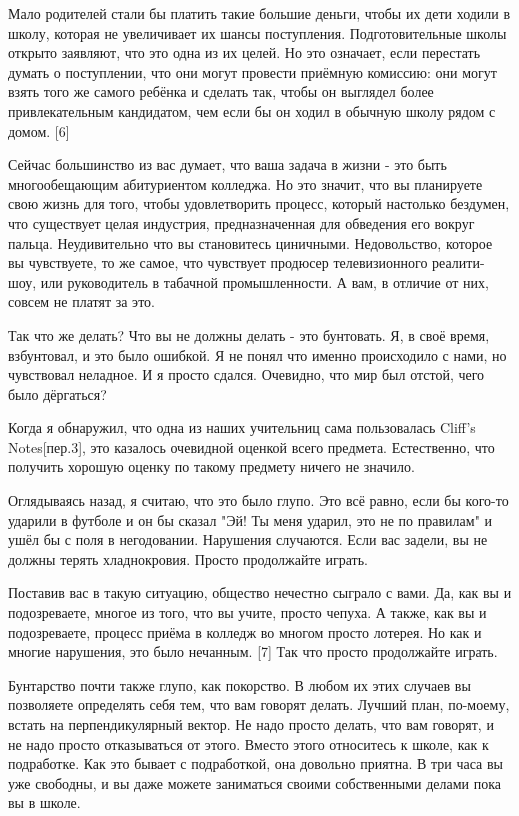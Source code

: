 \documentclass[ebook,12pt,oneside,openany]{memoir}
\begin{document}
Мало родителей стали бы платить такие большие деньги, чтобы их дети
ходили в школу, которая не увеличивает их шансы поступления.
Подготовительные школы открыто заявляют, что это одна из их целей. Но
это означает, если перестать думать о поступлении, что они могут
провести приёмную комиссию: они могут взять того же самого ребёнка и
сделать так, чтобы он выглядел более привлекательным кандидатом, чем
если бы он ходил в обычную школу рядом с домом. [6]

Сейчас большинство из вас думает, что ваша задача в жизни - это быть
многообещающим абитуриентом колледжа. Но это значит, что вы планируете
свою жизнь для того, чтобы удовлетворить процесс, который настолько
бездумен, что существует целая индустрия, предназначенная для
обведения его вокруг пальца. Неудивительно что вы становитесь
циничными. Недовольство, которое вы чувствуете, то же самое, что
чувствует продюсер телевизионного реалити-шоу, или руководитель в
табачной промышленности. А вам, в отличие от них, совсем не платят за
это.

Так что же делать? Что вы не должны делать - это бунтовать. Я, в своё
время, взбунтовал, и это было ошибкой. Я не понял что именно
происходило с нами, но чувствовал неладное. И я просто сдался.
Очевидно, что мир был отстой, чего было дёргаться?


Когда я обнаружил, что одна из наших учительниц сама пользовалась
Cliff's Notes[пер.3], это казалось очевидной оценкой всего предмета.
Естественно, что получить хорошую оценку по такому предмету ничего не
значило.

Оглядываясь назад, я считаю, что это было глупо. Это всё равно, если
бы кого-то ударили в футболе и он бы сказал "Эй! Ты меня ударил, это
не по правилам" и ушёл бы с поля в негодовании. Нарушения случаются.
Если вас задели, вы не должны терять хладнокровия. Просто продолжайте
играть.

Поставив вас в такую ситуацию, общество нечестно сыграло с вами. Да,
как вы и подозреваете, многое из того, что вы учите, просто чепуха. А
также, как вы и подозреваете, процесс приёма в колледж во многом
просто лотерея. Но как и многие нарушения, это было нечанным. [7] Так
что просто продолжайте играть.

Бунтарство почти также глупо, как покорство. В любом их этих случаев
вы позволяете определять себя тем, что вам говорят делать. Лучший
план, по-моему, встать на перпендикулярный вектор. Не надо просто
делать, что вам говорят, и не надо просто отказываться от этого.
Вместо этого относитесь к школе, как к подработке. Как это бывает с
подработкой, она довольно приятна. В три часа вы уже свободны, и вы
даже можете заниматься своими собственными делами пока вы в школе.
\end{document}
